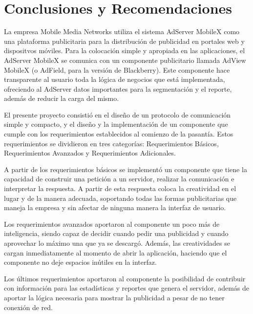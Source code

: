 
\chapter*{Conclusiones y Recomendaciones}

%

%
\vspace{5mm}


La empresa Mobile Media Networks utiliza el sistema AdServer MobileX
como una plataforma publicitaria para la distribución de publicidad
en portales web y dispositvos móviles. Para la colocación simple y
apropiada en las aplicaciones, el AdServer MobileX se comunica con
un componente publicitario llamada AdView MobileX (o AdField, para
la versión de Blackberry). Este componente hace transparente al usuario
toda la lógica de negocios que está implementada, ofreciendo al AdServer
datos importantes para la segmentación y el reporte, además de reducir
la carga del mismo.

El presente proyecto consistió en el diseño de un protocolo de comunicación
simple y compacto, y el diseño y la implementación de un componente
que cumple con los requerimientos establecidos al comienzo de la pasantía.
Estos requerimientos se dividieron en tres categorías: Requerimientos
Básicos, Requerimientos Avanzados y Requerimientos Adicionales.

A partir de los requerimientos básicos se implementó un componente
que tiene la capacidad de construir una petición a un servidor, realizar
la comunicación e interpretar la respuesta. A partir de esta respuesta
coloca la creatividad en el lugar y de la manera adecuada, soportando
todas las formas publicitarias que maneja la empresa y sin afectar
de ninguna manera la interfaz de usuario.

Los requerimientos avanzados aportaron al componente un poco más de
inteligencia, siendo capaz de decidir cuando pedir una publicidad
y cuando aprovechar lo máximo una que ya se descargó. Además, las
creatividades se cargan inmediatamente al momento de abrir la aplicación,
haciendo que el componente no deje espacios inútiles en la interfaz.

Los últimos requerimientos aportaron al componente la posibilidad
de contribuir con información para las estadísticas y reportes que
genera el servidor, además de aportar la lógica necesaria para mostrar
la publicidad a pesar de no tener conexión de red.

